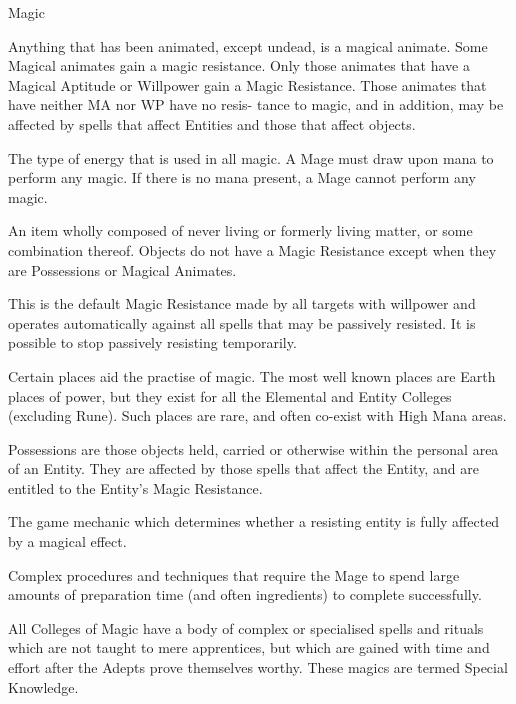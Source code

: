 \begin{Chapter}{Magic}
\begin{Description}
\item[Magical Animates] Anything that has been animated, except
  undead, is a magical animate. Some Magical animates gain a magic
  resistance.  Only those animates that have a Magical Aptitude or
  Willpower gain a Magic Resistance.  Those animates that have
  neither MA nor WP have no resis- tance to magic, and in addition,
  may be affected by spells that affect Entities and those that affect
  objects.

\item[Mana] The type of energy that is used in all magic.  A Mage must
  draw upon mana to perform any magic.  If there is no mana present, a
  Mage cannot perform any magic.

\item[Object] An item wholly composed of never living or formerly
  living matter, or some combination thereof.  Objects do not have a
  Magic Resistance except when they are Possessions or Magical
  Animates.

\item[Passive Resistance] This is the default Magic Resistance made by
  all targets with willpower and operates automatically against all
  spells that may be passively resisted.  It is possible to stop
  passively resisting temporarily.

\item[Place of Power] Certain places aid the practise of magic.  The
  most well known places are Earth places of power, but they exist for
  all the Elemental and Entity Colleges (excluding Rune). Such places
  are rare, and often co-exist with High Mana areas.

\item[Possessions] Possessions are those objects held, carried or
  otherwise within the personal area of an Entity. They are affected
  by those spells that affect the Entity, and are entitled to the
  Entity’s Magic Resistance.

\item[Resistance Check] The game mechanic which determines whether a
  resisting entity is fully affected by a magical effect.

\item[Ritual Magic] Complex procedures and techniques that require the
  Mage to spend large amounts of preparation time (and often
  ingredients) to complete successfully.

\item[Special Knowledge] All Colleges of Magic have a body of complex
  or specialised spells and rituals which are not taught to mere
  apprentices, but which are gained with time and effort after the
  Adepts prove themselves worthy. These magics are termed Special
  Knowledge.


\end{Description}
\end{Chapter}
